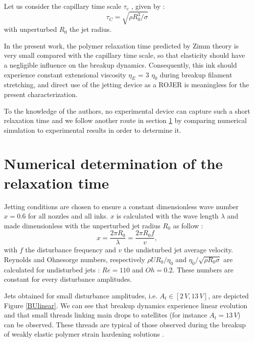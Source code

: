 \documentclass[twocolumn,10pt]{asme2ej}
\begin{document}
Let us consider the capillary time scale $\tau_c$ , given by :
\begin{equation}
    \tau_C= \sqrt{\rho R_0^3 / \sigma}
\end{equation}
with unperturbed $R_0$ the jet radius. 

In the present work, the polymer relaxation time predicted by Zimm theory is very small compared with the capillary time scale, so that elasticity should have a negligible influence on the breakup dynamics. Consequently, this ink should experience constant extensional viscosity $\eta_E$ = 3 $\eta_0$ during breakup filament stretching, and direct use of the jetting device as a ROJER \cite{keshavarz2015studying} is meaningless for the present characterization. 

To the knowledge of the authors, no experimental device can capture such a short relaxation time and we follow another route in section \ref{numericalDetermination} by comparing numerical simulation to experimental results in order to determine it.

\section{Numerical determination of the relaxation time} \label{numericalDetermination}





Jetting conditions are chosen to ensure a constant dimensionless wave number $x=0.6$ for all nozzles and all inks. $x$ is calculated with the wave length $\lambda$ and made dimensionless with the unperturbed jet radius $R_0$ as follow :
\begin{equation}
  x=\frac{2 \pi R_0}{\lambda}=\frac{2 \pi R_0 f}{v},
\end{equation} 
with $f$ the disturbance frequency and $v$ the undisturbed jet average velocity. Reynolds and Ohnesorge numbers, respectively $\rho U R_0 / \eta_0$ and $\eta_0/\sqrt{\rho R_0 \sigma}$ are calculated for undisturbed jets : $Re=110$ and $Oh=0.2$. These numbers are constant for every disturbance amplitudes.

Jets obtained for small disturbance amplitudes, i.e. $A_t \in [2 \, V,13 \, V]$, are  depicted Figure \ref{BUlinear}. We can see that breakup dynamics experience linear evolution and that small threads linking main drops to satellites (for instance $A_t = 13 \, V$) can be observed. These threads are typical of those observed during the breakup of weakly elastic polymer strain hardening solutions \cite{christanti2002effect}.
\end{document}
